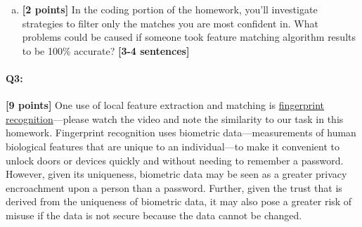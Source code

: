 \documentclass[11pt]{article}
\begin{document}
\begin{enumerate}[(a)]
    \pagebreak
    \item \textbf{[2 points]} In the coding portion of the homework, you'll investigate strategies to filter only the matches you are most confident in. What problems could be caused if someone took feature matching algorithm results to be 100\% accurate? \textbf{[3-4 sentences]}

\end{enumerate}

\pagebreak
\paragraph{Q3:} \textbf{[9 points]} One use of local feature extraction and matching is \href{https://www.youtube.com/watch?v=xD88Qs_DZp4}{fingerprint recognition}---please watch the video and note the similarity to our task in this homework. Fingerprint recognition uses biometric data---measurements of human biological features that are unique to an individual---to make it convenient to unlock doors or devices quickly and without needing to remember a password. However, given its uniqueness, biometric data may be seen as a greater privacy encroachment upon a person than a password. Further, given the trust that is derived from the uniqueness of biometric data, it may also pose a greater risk of misuse if the data is not secure because the data cannot be changed.
\end{document}
